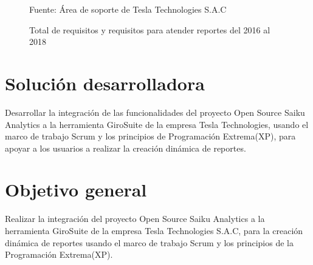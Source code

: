 \begin{spacing}{1.5}
	\begin{figure}[H]
		\begin{center}
			\tikzI
		\end{center}
		\caption {\centering \small{Total de requisitos y requisitos para atender reportes del 2016 al 2018}}
		\centering \small {Fuente: \'{A}rea de soporte de Tesla Technologies S.A.C} \label{figure:chaperI_1}
	\end{figure}
	
\end{spacing}

\clearpage
\section{Soluci\'{o}n desarrolladora}
\begin{spacing}{1.5}
	Desarrollar la integraci\'{o}n de las funcionalidades del proyecto Open Source Saiku Analytics a la herramienta GiroSuite de la empresa Tesla Technologies, usando el marco de trabajo Scrum y los principios de Programaci\'{o}n Extrema(XP), para apoyar a los usuarios a realizar la creaci\'{o}n din\'{a}mica de reportes.
\end{spacing}
\section{Objetivo general}
\begin{spacing}{1.5}
	Realizar la integraci\'{o}n del proyecto Open Source Saiku Analytics a la herramienta GiroSuite de la empresa Tesla Technologies S.A.C, para la creaci\'{o}n din\'{a}mica de reportes  usando el marco de trabajo Scrum y los principios de la Programaci\'{o}n Extrema(XP).
\end{spacing}
